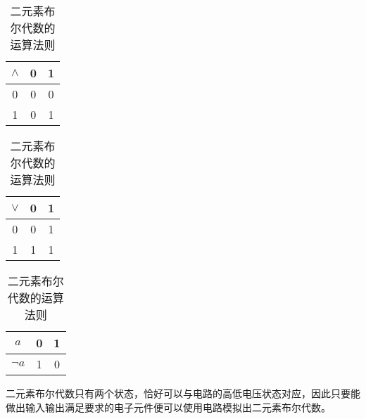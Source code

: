         \begin{table}[H]
            \centering
            \begin{tabular}{|c|c|c|}
                \hline
                $\wedge$ & 0 & 1 \\ \hline
                0        & 0 & 0 \\ \hline
                1        & 0 & 1 \\ \hline
            \end{tabular}
            \begin{tabular}{|c|c|c|}
                \hline
                $\vee$ & 0 & 1 \\ \hline
                0      & 0 & 1 \\ \hline
                1      & 1 & 1 \\ \hline
            \end{tabular}
            \begin{tabular}{|c|c|c|}
                \hline
                $a$      & 0 & 1 \\ \hline
                $\neg a$ & 1 & 0 \\ \hline
            \end{tabular}
            \caption{二元素布尔代数的运算法则}
            \label{tab:Calculations/BooleanAlgebra/TwoElementBooleanAlgebra/Operations}
        \end{table}

        二元素布尔代数只有两个状态，恰好可以与电路的高低电压状态对应，因此只要能做出输入输出满足要求的电子元件便可以使用电路模拟出二元素布尔代数。
